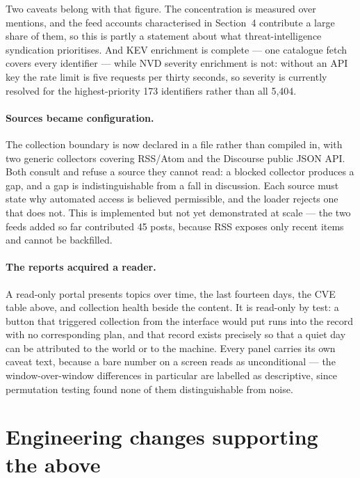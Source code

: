 \documentclass[11pt]{article}
\begin{document}
Two caveats belong with that figure. The concentration is measured over
mentions, and the feed accounts characterised in Section~4 contribute a large
share of them, so this is partly a statement about what threat-intelligence
syndication prioritises. And KEV enrichment is complete --- one catalogue fetch
covers every identifier --- while NVD severity enrichment is not: without an API
key the rate limit is five requests per thirty seconds, so severity is currently
resolved for the highest-priority 173 identifiers rather than all 5{,}404.

\paragraph{Sources became configuration.}
The collection boundary is now declared in a file rather than compiled in, with
two generic collectors covering RSS\slash Atom and the Discourse public JSON
API. Both consult  and refuse a source they cannot read: a
blocked collector produces a gap, and a gap is indistinguishable from a fall in
discussion. Each source must state why automated access is believed permissible,
and the loader rejects one that does not. This is implemented but not yet
demonstrated at scale --- the two feeds added so far contributed 45 posts,
because RSS exposes only recent items and cannot be backfilled.

\paragraph{The reports acquired a reader.}
A read-only portal presents topics over time, the last fourteen days, the CVE
table above, and collection health beside the content. It is read-only by test:
a button that triggered collection from the interface would put runs into the
record with no corresponding plan, and that record exists precisely so that a
quiet day can be attributed to the world or to the machine. Every panel carries
its own caveat text, because a bare number on a screen reads as unconditional ---
the window-over-window differences in particular are labelled as descriptive,
since permutation testing found none of them distinguishable from noise.

\section{Engineering changes supporting the above}
\end{document}
